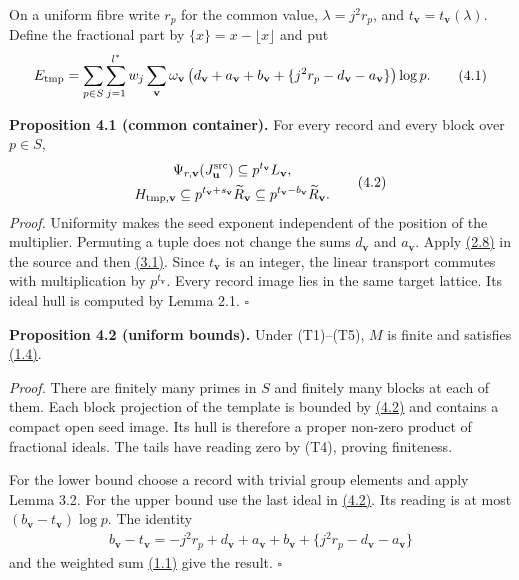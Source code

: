 \documentclass[11pt,a4paper]{amsart}
\begin{document}
On a uniform fibre write $r_p$ for the common value, $\lambda=j^2r_p$, and $t_{\mathbf v}=t_{\mathbf v}(\lambda)$. Define the fractional part by $\{x\}=x-\lfloor x\rfloor$ and put
\begin{equation}
\begin{gathered}
E_{\rm tmp}=\sum_{p\in S}\sum_{j=1}^{l^*}w_j
\sum_{\mathbf v}\omega_{\mathbf v}
\left(d_{\mathbf v}+a_{\mathbf v}+b_{\mathbf v}
+\{j^2r_p-d_{\mathbf v}-a_{\mathbf v}\}\right)\log p.
\end{gathered}
\tag{4.1}\label{eq:4.1}
\end{equation}
\par\smallskip\noindent\textbf{Proposition 4.1 (common container).} For every record and every block over $p\in S$,
\begin{equation}
\begin{gathered}
\Psi_{r,\mathbf v}(J^{\rm src}_{\mathbf u})\subseteq p^{t_{\mathbf v}}L_{\mathbf v},\\
H_{{\rm tmp},\mathbf v}\subseteq p^{t_{\mathbf v}+s_{\mathbf v}}\widetilde R_{\mathbf v}
\subseteq p^{t_{\mathbf v}-b_{\mathbf v}}\widetilde R_{\mathbf v}.
\end{gathered}
\tag{4.2}\label{eq:4.2}
\end{equation}
\emph{Proof.} Uniformity makes the seed exponent independent of the position of the multiplier. Permuting a tuple does not change the sums $d_{\mathbf v}$ and $a_{\mathbf v}$. Apply \hyperref[eq:2.8]{(2.8)} in the source and then \hyperref[eq:3.1]{(3.1)}. Since $t_{\mathbf v}$ is an integer, the linear transport commutes with multiplication by $p^{t_{\mathbf v}}$. Every record image lies in the same target lattice. Its ideal hull is computed by Lemma 2.1. \hfill$\square$


\par\smallskip\noindent\textbf{Proposition 4.2 (uniform bounds).} Under (T1)--(T5), $M$ is finite and satisfies \hyperref[eq:1.4]{(1.4)}.


\emph{Proof.} There are finitely many primes in $S$ and finitely many blocks at each of them. Each block projection of the template is bounded by \hyperref[eq:4.2]{(4.2)} and contains a compact open seed image. Its hull is therefore a proper non-zero product of fractional ideals. The tails have reading zero by (T4), proving finiteness.


For the lower bound choose a record with trivial group elements and apply Lemma 3.2. For the upper bound use the last ideal in \hyperref[eq:4.2]{(4.2)}. Its reading is at most $(b_{\mathbf v}-t_{\mathbf v})\log p$. The identity
\begin{equation}
\begin{gathered}
b_{\mathbf v}-t_{\mathbf v}=-j^2r_p+d_{\mathbf v}+a_{\mathbf v}+b_{\mathbf v}
+\{j^2r_p-d_{\mathbf v}-a_{\mathbf v}\}
\end{gathered}
\tag{4.3}\label{eq:4.3}
\end{equation}
and the weighted sum \hyperref[eq:1.1]{(1.1)} give the result. \hfill$\square$
\end{document}
